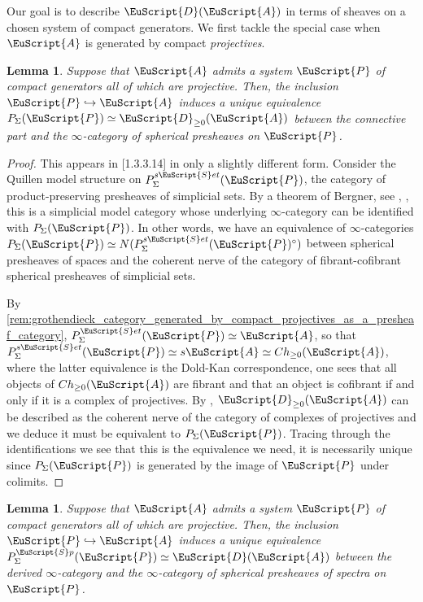 \documentclass[oneside,a4paper]{amsart}
\newcommand{\euscr}[1]{\EuScript{#1}} %
\newcommand{\acat}{\euscr{A}} %
\newcommand{\dcat}{\euscr{D}} %
\newcommand{\pcat}{\euscr{P}} %
\newcommand{\spectra}{\euscr{S}p} %
\newcommand{\sets}{\euscr{S}et} %
\theoremstyle{plain}
\newtheorem{lemma}[thm]{Lemma}
\theoremstyle{definition}
\theoremstyle{remark}
\begin{document}
Our goal is to describe $\dcat(\acat)$ in terms of sheaves on a chosen system of compact generators. We first tackle the special case when $\acat$ is generated by compact \emph{projectives}. 

\begin{lemma}
\label{lemma:connective_derived_category_of_a_grothendieck_cat_generated_by_projectives}
Suppose that $\acat$ admits a system $\pcat$ of compact generators all of which are projective. Then, the inclusion $\pcat \hookrightarrow \acat$ induces a unique equivalence $P_{\Sigma}(\pcat) \simeq \dcat_{\geq 0}(\acat)$ between the connective part and the $\infty$-category of spherical presheaves on $\pcat$.  
\end{lemma}

\begin{proof}
This appears in \cite{higher_algebra}[1.3.3.14] in only a slightly different form. Consider the Quillen model structure on $P_{\Sigma}^{s\sets}(\pcat)$, the category of product-preserving presheaves of simplicial sets. By a theorem of Bergner, see \cite[5.5.9.3]{lurie_higher_topos_theory}, \cite{bergner_rigidification_of_algebras}, this is a simplicial model category whose underlying $\infty$-category can be identified with $P_{\Sigma}(\pcat)$. In other words, we have an equivalence of $\infty$-categories $P_{\Sigma}(\pcat) \simeq N(P_{\Sigma}^{s\sets}(\pcat)^{\circ})$ between spherical presheaves of spaces and the coherent nerve of the category of fibrant-cofibrant spherical presheaves of simplicial sets. 

By \cref{rem:grothendieck_category_generated_by_compact_projectives_as_a_presheaf_category}, $P_{\Sigma}^{\sets}(\pcat) \simeq \acat$, so that $P_{\Sigma}^{s\sets}(\pcat) \simeq s \acat \simeq Ch_{\geq 0}(\acat)$, where the latter equivalence is the Dold-Kan correspondence, one sees that all objects of $Ch_{\geq 0}(\acat)$ are fibrant and that an object is cofibrant if and only if it is a complex of projectives. By \cite[1.3.2.22]{higher_algebra}, $\dcat_{\geq 0}(\acat)$ can be described as the coherent nerve of the category of complexes of projectives and we deduce it must be equivalent to $P_{\Sigma}(\pcat)$. Tracing through the identifications we see that this is the equivalence we need, it is necessarily unique since $P_{\Sigma}(\pcat)$ is generated by the image of $\pcat$ under colimits. 
\end{proof}

\begin{lemma}
\label{lemma:derived_category_of_a_grothendieck_category_generated_by_compact_projectives}
Suppose that $\acat$ admits a system $\pcat$ of compact generators all of which are projective. Then, the inclusion $\pcat \hookrightarrow \acat$ induces a unique equivalence $P_{\Sigma}^{\spectra}(\pcat) \simeq \dcat(\acat)$ between the derived $\infty$-category and the $\infty$-category of spherical presheaves of spectra on $\pcat$.  
\end{lemma}
\end{document}
